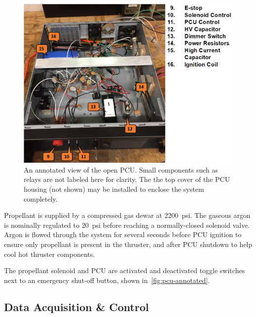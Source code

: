 \documentclass[journal]{IEEEtran}
\begin{document}
\begin{figure}[htp]
  \includegraphics[width=\linewidth]{figs/pcu-annotated.PNG}
  \caption{An annotated view of the open PCU.\@
  Small components such as relays are not labeled here for clarity.
  The the top cover of the PCU housing (not shown) may be installed to enclose the system completely.
\label{fig:pcu-annotated}
}
\end{figure}

Propellant is supplied by a compressed gas dewar at \SI{2200}{psi}.
The gaseous argon is nominally regulated to \SI{20}{psi} before reaching a normally-closed solenoid valve.
Argon is flowed through the system for several seconds before PCU ignition to ensure only propellant is present in the thruster, and after PCU shutdown to help cool hot thruster components.

The propellant solenoid and PCU are activated and deactivated toggle switches next to an emergency shut-off button, shown in~\autoref{fig:pcu-annotated}.

\subsection{Data Acquisition \& Control}
\end{document}
